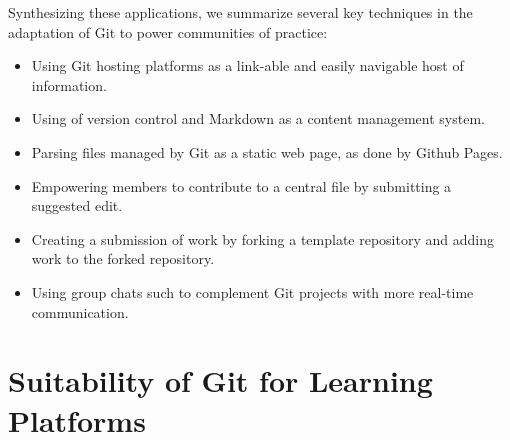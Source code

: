 \documentclass[12pt,twoside,vi]{mitthesis}
\begin{document}
{Synthesizing these applications, we summarize several key techniques in the adaptation of Git to power communities of practice:
\begin{itemize}
\item Using Git hosting platforms as a link-able and easily navigable host of information.
\item Using of version control and Markdown as a content management system.
\item Parsing files managed by Git as a static web page, as done by Github Pages.
\item Empowering members to contribute to a central file by submitting a suggested edit.
\item Creating a submission of work by forking a template repository and adding work to the forked repository.
\item Using group chats such to complement Git projects with more real-time communication.
\end{itemize}
}

\section{Suitability of Git for Learning Platforms}
\end{document}
